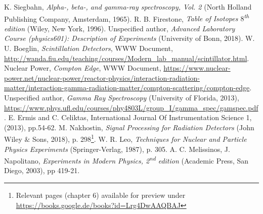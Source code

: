 \documentclass[twocolumn]{article}
\begin{document}
\begin{thebibliography}{9}
K. Siegbahn, \textsl{Alpha-, beta-, and gamma-ray spectroscopy, Vol. 2} (North Holland Publishing Company, Amsterdam, 1965).
R. B. Firestone, \textsl{Table of Isotopes $8$\textsuperscript{th} edition} (Wiley, New York, 1996).
Unspecified author, \textsl{Advanced Laboratory Course (physics601): Description of Experiments} (University of Bonn, 2018).
 W. U. Boeglin, \textit{Scintillation Detectors}, WWW Document, \url{http://wanda.fiu.edu/teaching/courses/Modern_lab_manual/scintillator.html}.
 Nuclear Power, \textit{Compton Edge}, WWW Document,
\url{https://www.nuclear-power.net/nuclear-power/reactor-physics/interaction-radiation-matter/interaction-gamma-radiation-matter/compton-scattering/compton-edge}.
Unspecified author, \textit{Gamma Ray Spectroscopy} (University of Florida, 2013), \url{https://www.phys.ufl.edu/courses/phy4803L/group_I/gamma_spec/gamspec.pdf}.
E. Ermis and C. Celiktas, International Journal Of Instrumentation Science 1, (2013), pp.54-62.
M. Nakhostin, \textsl{Signal Processing for Radiation Detectors} (John Wiley $\&$ Sons, 2018), p. 298\footnote{Relevant pages (chapter 6) available for preview under\\ \url{https://books.google.de/books?id=Lrg4DwAAQBAJ}}.
W. R. Leo, \textsl{Techniques for Nuclear and Particle Physics Experiments} (Springer-Verlag, 1987), p. 305.
A. C. Melissinos, J. Napolitano, \textsl{Experiments in Modern Physics, 2\textsuperscript{nd} edition} (Academic Press, San Diego, 2003), pp 419-21.
\end{thebibliography}
\end{document}
